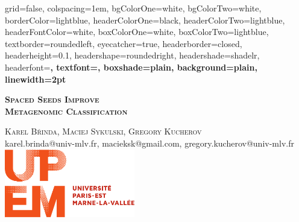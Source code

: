\documentclass[portrait,final,a0paper,fontscale=0.277]{baposter}
\begin{document}
\begin{poster}%
  {
  grid=false,
  colspacing=1em,
  bgColorOne=white,
  bgColorTwo=white,
  borderColor=lightblue,
  headerColorOne=black,
  headerColorTwo=lightblue,
  headerFontColor=white,
  boxColorOne=white,
  boxColorTwo=lightblue,
  textborder=roundedleft,
  eyecatcher=true,
  headerborder=closed,
  headerheight=0.1\textheight,
  headershape=roundedright,
  headershade=shadelr,
  headerfont=\Large\bf\textsc, %
  textfont={\setlength{\parindent}{1.5em}},
  boxshade=plain,
  background=plain,
  linewidth=2pt
  }
  {%
  } 
  {\begingroup
      \bf\textsc{Spaced Seeds Improve\\
      \vspace{0.2em}
	      Metagenomic Classification}
   \endgroup
   \vspace{0.2em}}
  {\textsc{Karel B{\v r}inda, Maciej Sykulski, Gregory Kucherov}\\
   {\small karel.brinda@univ-mlv.fr, macieksk@gmail.com, gregory.kucherov@univ-mlv.fr}}
  {%
    \includegraphics[height=8.0em]{images/UPEM_LOGO_SIGNALETIQUE.pdf}
  }

    \newcommand{\colouredcircle}{%
      \tikz{\useasboundingbox (-0.2em,-0.32em) rectangle(0.2em,0.32em); \draw[draw=black,fill=lightblue,line width=0.03em] (0,0) circle(0.18em);}}


\end{poster}
\end{document}
